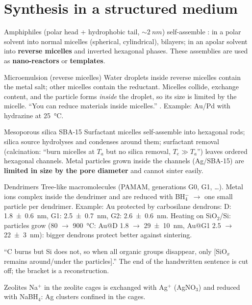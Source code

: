 \section{Synthesis in a structured medium}
Amphiphiles (polar head + hydrophobic tail, $\sim\SI{2}{nm}$) self-assemble : in a polar solvent into
normal micelles (spherical, cylindrical), bilayers; in an apolar solvent into \textbf{reverse micelles} and inverted
hexagonal phases. These assemblies are used as \textbf{nano-reactors} or \textbf{templates}.

\begin{cardbox}{Microemulsion (reverse micelles) }
Water droplets inside reverse micelles contain the metal salt; other micelles contain the reductant. Micelles collide,
exchange content, and the particle forms \emph{inside} the droplet, so its size is limited by the micelle.
``You can reduce materials inside micelles.''
. Example: Au/Pd with hydrazine at \SI{25}{\celsius}.
\end{cardbox}
\begin{cardbox}{Mesoporous silica SBA-15 }
Surfactant micelles self-assemble into hexagonal rods; silica source hydrolyses and condenses around them; surfactant
removal (calcination: ``burn micelles at $T_a$ but no silica removal, $T_e\gg T_a$'') leaves ordered hexagonal channels.
Metal particles grown inside the channels (Ag/SBA-15) are \textbf{limited in size by the pore diameter} and
cannot sinter easily.
\end{cardbox}
\begin{cardbox}{Dendrimers }
Tree-like macromolecules (PAMAM, generations G0, G1, \ldots). Metal ions complex inside the dendrimer and are reduced
with BH$_4^-$ $\to$ one small particle per dendrimer. Example: Au protected by carbosilane dendrons:
D: \SI{1.8+-0.6}{nm}, G1: \SI{2.5+-0.7}{nm}, G2: \SI{2.6+-0.6}{nm}.
Heating on SiO$_2$/Si: particles grow (80 $\to$ \SI{900}{\celsius}: Au@D 1.8 $\to$ \SI{29+-10}{nm}, Au@G1 2.5 $\to$
\SI{22+-3}{nm}): bigger dendrons protect better against sintering.
\end{cardbox}
\begin{classbox}
 ``C burns but Si does not, so when all organic groups disappear, only [SiO$_x$ remains around/under
the particles].'' The end of the handwritten sentence is cut off; the bracket is a reconstruction.
\end{classbox}
\begin{cardbox}{Zeolites }
Na$^+$ in the zeolite cages is exchanged with Ag$^+$ (AgNO$_3$) and reduced with NaBH$_4$: Ag clusters confined in the cages.
\end{cardbox}

